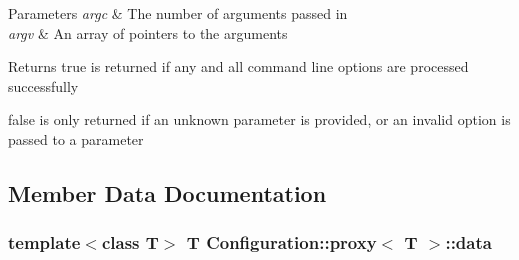 \begin{DoxyParams}{Parameters}
{\em argc} & The number of arguments passed in \\
\hline
{\em argv} & An array of pointers to the arguments \\
\hline
\end{DoxyParams}
\begin{DoxyReturn}{Returns}
true is returned if any and all command line options are processed successfully 

false is only returned if an unknown parameter is provided, or an invalid option is passed to a parameter 
\end{DoxyReturn}


\subsection{Member Data Documentation}
\subsubsection[{data}]{\setlength{\rightskip}{0pt plus 5cm}template$<$class T$>$ T {\bf Configuration\-::proxy}$<$ T $>$\-::data\hspace{0.3cm}{\ttfamily [private]}}\label{class_configuration_1_1proxy_aeff1982d30095641c59ada398672b8e1}
